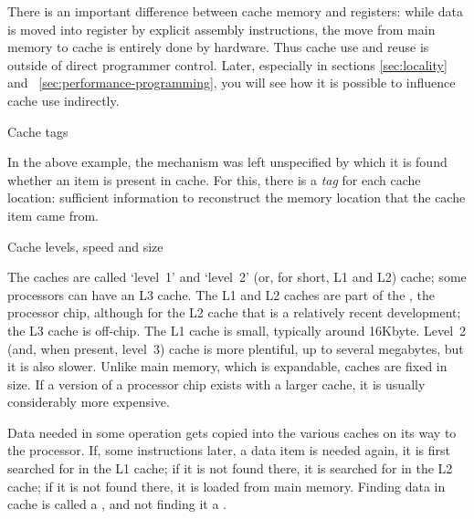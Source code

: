 There is an important difference between cache memory and registers:
while data is moved into register by explicit assembly instructions,
the move from main memory to cache is entirely done by hardware.  Thus
cache use and reuse is outside of direct programmer control. Later,
especially in sections \ref{sec:locality} and
~\ref{sec:performance-programming}, you will see how it is possible to
influence cache use indirectly.

 {Cache tags}
\label{sec:cache-tag}

In the above example, the mechanism was left unspecified by which it is found whether an
item is present in cache. For this, there is a
%
\emph{tag}
for each cache location: sufficient information to reconstruct the
memory location that the cache item came from.

 {Cache levels, speed and size}
\label{sec:cache-level}

The caches are called `level~1' and `level~2' (or, for short, L1 and
L2) cache; some processors can have an L3 cache.  The L1 and L2 caches
are part of the , the processor chip, although for the
L2 cache that is a relatively recent development; the L3 cache is
off-chip.  The L1 cache is small, typically around 16Kbyte. Level~2
(and, when present, level~3) cache is more plentiful, up to several
megabytes, but it is also slower.  Unlike main memory, which is
expandable, caches are fixed in size. If a version of a processor chip
exists with a larger cache, it is usually considerably more expensive.

Data needed in some operation gets copied into the various
caches on its way to the processor. If, some instructions later, a
data item is needed again, it is first searched for in the L1 cache; if it is
not found there, it is searched for in the L2 cache; if it is not found there,
it is loaded from main memory. Finding data in cache is called a
, and not finding it a .

